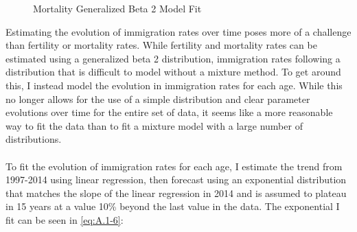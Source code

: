 \documentclass[10pt]{article}
\renewcommand{\thesection}{\arabic{section}}
\renewcommand{\thesubsection}{\thesection.\arabic{subsection}}
\renewcommand{\thesubsubsection}{\thesubsection.\arabic{subsubsection}}
\numberwithin{equation}{subsection}
\renewcommand{\subsubsection}[2][]{\oldsubsubsection[#1]{#2}\index{#1}\label{sec:\thesubsubsection}}
\newcommand*{\FigureDir}{../../graphs}
\begin{document}
\begin{appendices}
\begin{figure}[H]
   \centering
   \caption{\label{fig:\thesubsubsection4}Mortality Generalized Beta 2 Model Fit}
\end{figure}


\subsubsection{Immigration Rates}

Estimating the evolution of immigration rates over time poses more of a challenge than fertility or mortality rates. While fertility and mortality rates can be estimated using a generalized beta 2 distribution, immigration rates following a distribution that is difficult to model without a mixture method. To get around this, I instead model the evolution in immigration rates for each age. While this no longer allows for the use of a simple distribution and clear parameter evolutions over time for the entire set of data, it seems like a more reasonable way to fit the data than to fit a mixture model with a large number of distributions.
\\\\
To fit the evolution of immigration rates for each age, I estimate the trend from 1997-2014 using linear regression, then forecast using an exponential distribution that matches the slope of the linear regression in 2014 and is assumed to plateau in 15 years at a value 10\% beyond the last value in the data. The exponential I fit can be seen in \ref{eq:A.1-6}:


\end{appendices}
\end{document}
